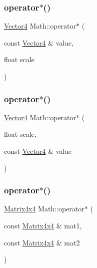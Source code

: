 \mbox{\label{namespace_math_a2c882069472ade27f2265b16041baf76}} 
\subsubsection{\texorpdfstring{operator$\ast$()}{operator*()}\hspace{0.1cm}{\footnotesize\ttfamily [5/19]}}
{\footnotesize\ttfamily \mbox{\hyperlink{struct_math_1_1_vector4}{Vector4}} Math\+::operator$\ast$ (\begin{DoxyParamCaption}\item[{const \mbox{\hyperlink{struct_math_1_1_vector4}{Vector4}} \&}]{value,  }\item[{float}]{scale }\end{DoxyParamCaption})}

\mbox{\label{namespace_math_a3dd17b1db67faf64ebabe1e113d40af4}} 
\subsubsection{\texorpdfstring{operator$\ast$()}{operator*()}\hspace{0.1cm}{\footnotesize\ttfamily [6/19]}}
{\footnotesize\ttfamily \mbox{\hyperlink{struct_math_1_1_vector4}{Vector4}} Math\+::operator$\ast$ (\begin{DoxyParamCaption}\item[{float}]{scale,  }\item[{const \mbox{\hyperlink{struct_math_1_1_vector4}{Vector4}} \&}]{value }\end{DoxyParamCaption})}

\mbox{\label{namespace_math_a06472d628f45d93a8bdb7cdcb0b1be8d}} 
\subsubsection{\texorpdfstring{operator$\ast$()}{operator*()}\hspace{0.1cm}{\footnotesize\ttfamily [7/19]}}
{\footnotesize\ttfamily \mbox{\hyperlink{struct_math_1_1_matrix4x4}{Matrix4x4}} Math\+::operator$\ast$ (\begin{DoxyParamCaption}\item[{const \mbox{\hyperlink{struct_math_1_1_matrix4x4}{Matrix4x4}} \&}]{mat1,  }\item[{const \mbox{\hyperlink{struct_math_1_1_matrix4x4}{Matrix4x4}} \&}]{mat2 }\end{DoxyParamCaption})}

